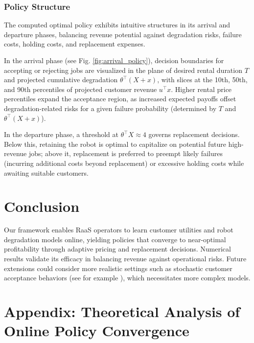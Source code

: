 \documentclass[letterpaper, 10 pt, conference]{IEEEconf}
\begin{document}
\subsubsection{Policy Structure}
The computed optimal policy exhibits intuitive structures in its arrival and departure phases, balancing revenue potential against degradation risks, failure costs, holding costs, and replacement expenses.

In the arrival phase (see Fig. \ref{fig:arrival_policy}), decision boundaries for accepting or rejecting jobs are visualized in the plane of desired rental duration $T$ and projected cumulative degradation $\theta^\top (X+x)$, with slices at the 10th, 50th, and 90th percentiles of projected customer revenue $u^\top x$. Higher rental price percentiles expand the acceptance region, as increased expected payoffs offset degradation-related risks for a given failure probability (determined by $T$ and $\theta^\top(X+x)$).

In the departure phase, a threshold at $\theta^\top X \approx 4$ governs replacement decisions. Below this, retaining the robot is optimal to capitalize on potential future high-revenue jobs; above it, replacement is preferred to preempt likely failures (incurring additional costs beyond replacement) or excessive holding costs while awaiting suitable customers.

\section{Conclusion}
Our framework enables RaaS operators to learn customer utilities and robot degradation models online, yielding policies that converge to near-optimal profitability through adaptive pricing and replacement decisions. Numerical results validate its efficacy in balancing revenue against operational risks. Future extensions could consider more realistic settings such as stochastic customer acceptance behaviors (see for example \cite{dogan2023estimating}), which necessitates more complex models.

\setcounter{remark}{0}

\section*{Appendix: Theoretical Analysis of Online Policy Convergence}
\end{document}
